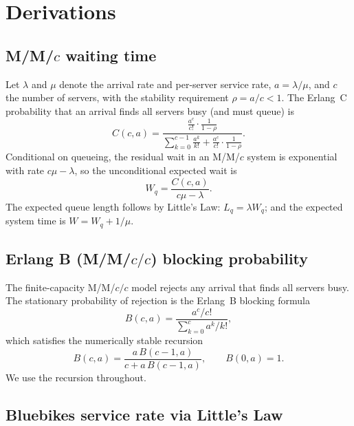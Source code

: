\section{Derivations}\label{app:derivations}

\subsection{M/M/$c$ waiting time}\label{app:mmc}

Let $\lambda$ and $\mu$ denote the arrival rate and per-server service rate, $a = \lambda/\mu$, and $c$ the number of servers, with the stability requirement $\rho = a/c < 1$. The Erlang~C probability that an arrival finds all servers busy (and must queue) is
\begin{equation}
C(c, a) = \frac{\frac{a^c}{c!}\cdot\frac{1}{1-\rho}}{\sum_{k=0}^{c-1} \frac{a^k}{k!} + \frac{a^c}{c!}\cdot\frac{1}{1-\rho}}.
\end{equation}
Conditional on queueing, the residual wait in an M/M/$c$ system is exponential with rate $c\mu - \lambda$, so the unconditional expected wait is
\begin{equation}
W_q = \frac{C(c, a)}{c\mu - \lambda}.
\end{equation}
The expected queue length follows by Little's Law: $L_q = \lambda W_q$; and the expected system time is $W = W_q + 1/\mu$.

\subsection{Erlang B (M/M/$c/c$) blocking probability}\label{app:erlangb}

The finite-capacity M/M/$c/c$ model rejects any arrival that finds all servers busy. The stationary probability of rejection is the Erlang~B blocking formula
\begin{equation}
B(c, a) = \frac{a^c / c!}{\sum_{k=0}^{c} a^k / k!},
\end{equation}
which satisfies the numerically stable recursion
\begin{equation}
B(c, a) = \frac{a\,B(c-1, a)}{c + a\,B(c-1, a)}, \qquad B(0, a) = 1.
\end{equation}
We use the recursion throughout.

\subsection{Bluebikes service rate via Little's Law}\label{app:little}

